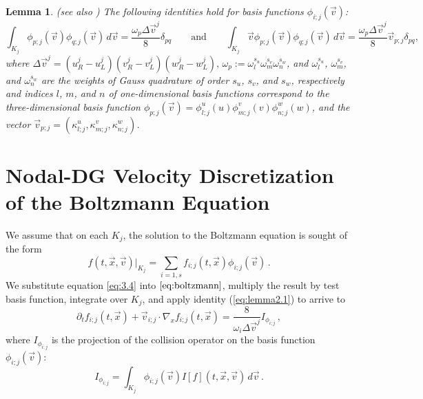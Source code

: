 \documentclass[12pt]{CSUNthesis}
\newtheorem{lemma}{Lemma}
\newcommand{\vecv}{\vec{v}}
\begin{document}
\begin{lemma} (see also \cite{AlekseenkoJosyula2012a, HesthavenWarburtoin2007})
The following identities hold for basis functions $\phi_{i;j}(\vec{v})$:
\begin{equation}
\label{eq:lemma2.1} 
\int_{K_{j}} \phi_{p;j}(\vec{v})\phi_{q;j}(\vec{v})\, d\vec{v} = \frac{\omega_{p}\Delta\vec{v}^{j}}{8}\delta_{pq}
\qquad\mbox{and} \qquad
\int_{K_{j}} \vec{v}\phi_{p;j}(\vec{v})\phi_{q;j}(\vec{v})\, d\vec{v} 
= \frac{\omega_{p}\Delta\vec{v}^{j}}{8}\vec{v}_{p;j}\delta_{pq},
\end{equation}
where $\Delta \vecv^j = (u^j_R-u^j_L)(v^j_R-v^j_L)(w^j_R-w^j_L),\, \omega_p := \omega^{s_u}_l\omega^{s_v}_m\omega^{s_w}_n$, and $\omega^{s_u}_l$, $\omega^{s_v}_m$, and $\omega^{s_w}_n$ are the weights of Gauss quadrature of order $s_u$, $s_v$, and $s_w$, respectively and indices $l$, $m$, and $n$ of one-dimensional basis functions correspond to the three-dimensional basis function 
$\phi_{p;j}(\vec{v})=
\phi^{u}_{l;j}(u)\phi^{v}_{m;j}(v)\phi^{w}_{n;j}(w)$, 
and the vector $\vec{v}_{p;j}=(\kappa^{u}_{l;j},\kappa^{v}_{m;j},\kappa^{w}_{n;j})$. 
\end{lemma}
\section{Nodal-DG Velocity Discretization of the Boltzmann Equation}
We assume that on each $K_j$, the solution to the Boltzmann equation is sought of the form 
\begin{equation}
\label{eq:3.4}
f(t,\vec{x},\vec{v})|_{K_{j}} = \sum_{i=1,s} f_{i;j}(t,\vec{x})\phi_{i;j}(\vec{v})\, .
\end{equation}
We substitute equation \ref{eq:3.4} into $\ref{eq:boltzmann}$, multiply the result by test basis function, integrate over $K_j$, and apply identity (\ref{eq:lemma2.1}) to arrive to
\begin{equation}
\label{discveloblzm}
\partial_{t} f_{i;j}(t,\vec{x}) + \vec{v}_{i;j}\cdot \nabla_{x} f_{i;j}(t,\vec{x}) =
\frac{8}{\omega_{i}\Delta\vec{v}^{j}}I_{\phi_{i;j}}\, ,
\end{equation}
where $I_{\phi_{i;j}}$ is the projection of the collision operator 
on the basis function $\phi_{i;j}(\vec{v})$:
\begin{equation}
\label{eq:projcoll}
I_{\phi_{i;j}} = \int_{K_{j}}\phi_{i;j}(\vec{v}) I[f](t,\vec{x},\vec{v})\, d\vec{v}\, .
\end{equation} 
\end{document}
